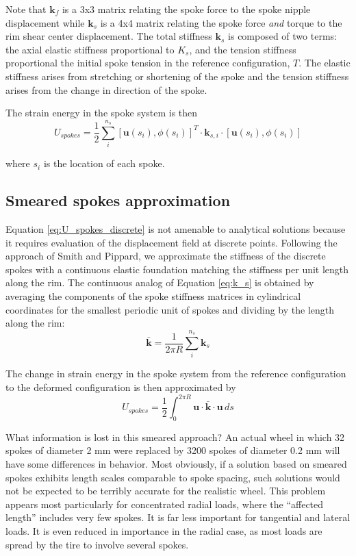 \documentclass[../thesis.tex]{subfiles}
\begin{document}
Note that $\mathbf{k}_f$ is a 3x3 matrix relating the spoke force to the spoke nipple displacement while $\mathbf{k}_s$ is a 4x4 matrix relating the spoke force \emph{and} torque to the rim shear center displacement. The total stiffness $\mathbf{k}_s$ is composed of two terms: the axial elastic stiffness proportional to $K_s$, and the tension stiffness proportional the initial spoke tension in the reference configuration, $T$. The elastic stiffness arises from stretching or shortening of the spoke and the tension stiffness arises from the change in direction of the spoke.

The strain energy in the spoke system is then
\begin{equation}
\label{eq:U_spokes_discrete}
U_{spokes} = \frac{1}{2} \sum_i^{n_s} [\mathbf{u}(s_i), \phi(s_i)]^T \cdot \mathbf{k}_{s,i}\cdot [\mathbf{u}(s_i), \phi(s_i)]
\end{equation}

where $s_i$ is the location of each spoke.

\subsection{Smeared spokes approximation}
Equation \ref{eq:U_spokes_discrete} is not amenable to analytical solutions because it requires evaluation of the displacement field at discrete points. Following the approach of Smith\cite{Smith} and Pippard\cite{Pippard}, we approximate the stiffness of the discrete spokes with a continuous elastic foundation matching the stiffness per unit length along the rim. The continuous analog of Equation \eqref{eq:k_s} is obtained by averaging the components of the spoke stiffness matrices in cylindrical coordinates for the smallest periodic unit of spokes and dividing by the length along the rim:
\begin{equation}
\label{eq:k_bar}
\mathbf{\bar{k}} = \frac{1}{2\pi R} \sum_i^{n_s} \mathbf{k}_s
\end{equation}

The change in strain energy in the spoke system from the reference configuration to the deformed configuration is then approximated by
\begin{equation}
\label{eq:U_spokes}
U_{spokes} = \frac{1}{2}\int_0^{2\pi R} \mathbf{u} \cdot \mathbf{\bar{k}} \cdot \mathbf{u} \, ds
\end{equation}

What information is lost in this smeared approach? An actual wheel in which 32 spokes of diameter 2 mm were replaced by 3200 spokes of diameter 0.2 mm will have some differences in behavior.
Most obviously, if a solution based on smeared spokes exhibits length scales comparable to spoke spacing, such solutions would not be expected to be terribly accurate for the realistic wheel. This problem appears most particularly for concentrated radial loads, where the ``affected length'' includes very few spokes. It is far less important for tangential and lateral loads. It is even reduced in importance in the radial case, as most loads are spread by the tire to involve several spokes.
\end{document}
